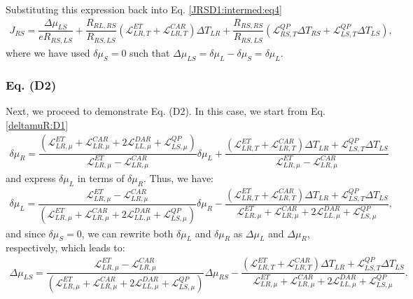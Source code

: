 Substituting this expression back into Eq. \eqref{JRSD1:intermed:eq4}
\begin{align}\label{JRSD1:intermed:eq5}
J_{RS}=
\dfrac{\Delta\mu_{LS}}{eR_{RS,LS}}
+
\dfrac{R_{RL,RS}}{R_{RS,LS}}
(\mathcal{L}_{LR,T}^{ET}+\mathcal{L}_{LR,T}^{CAR})\Delta T_{LR}
+
\dfrac{R_{RS,RS}}{R_{RS,LS}}(\mathcal{L}^{QP}_{RS,T}\Delta T_{RS}+\mathcal{L}^{QP}_{LS,T}\Delta T_{LS}),
\end{align}
where we have used $\delta\mu_{S}=0$ such that $\Delta\mu_{LS}=\delta\mu_{L}-\delta\mu_{S}=\delta\mu_{L}$.

\subsubsection{Eq. (D2)}

Next, we proceed to demonstrate Eq. (D2). In this case, we start from Eq. \eqref{deltamuR:D1}
\begin{multline*}
\delta\mu_{R}=\dfrac{
(\mathcal{L}_{LR,\mu}^{ET}+\mathcal{L}_{LR,\mu}^{CAR}+2\mathcal{L}_{LL,\mu}^{DAR}+\mathcal{L}^{QP}_{LS,\mu})
}{\mathcal{L}_{LR,\mu}^{ET}-\mathcal{L}_{LR,\mu}^{CAR}}\delta\mu_{L}
+
\dfrac{
(\mathcal{L}_{LR,T}^{ET}+\mathcal{L}_{LR,T}^{CAR})\Delta T_{LR}
+
\mathcal{L}^{QP}_{LS,T}\Delta T_{LS}}{\mathcal{L}_{LR,\mu}^{ET}-\mathcal{L}_{LR,\mu}^{CAR}}
\end{multline*}
and express $\delta\mu_{L}$ in terms of $\delta\mu_{R}$. Thus, we have:
\begin{align*}
\delta\mu_{L}=\dfrac{\mathcal{L}_{LR,\mu}^{ET}-\mathcal{L}_{LR,\mu}^{CAR}}{(\mathcal{L}_{LR,\mu}^{ET}+\mathcal{L}_{LR,\mu}^{CAR}+2\mathcal{L}_{LL,\mu}^{DAR}+\mathcal{L}^{QP}_{LS,\mu})}\delta\mu_{R}
-
\dfrac{
(\mathcal{L}_{LR,T}^{ET}+\mathcal{L}_{LR,T}^{CAR})\Delta T_{LR}
+
\mathcal{L}^{QP}_{LS,T}\Delta T_{LS}}{\mathcal{L}_{LR,\mu}^{ET}+\mathcal{L}_{LR,\mu}^{CAR}+2\mathcal{L}_{LL,\mu}^{DAR}+\mathcal{L}^{QP}_{LS,\mu}},
\end{align*}
and since $\delta\mu_{S}=0$, we can rewrite both $\delta\mu_{L}$ and $\delta\mu_{R}$ as $\Delta\mu_{L}$ and $\Delta\mu_{R}$, respectively, which leads to:
\begin{align}\label{DeltamuLSRS}
\Delta\mu_{LS}=\dfrac{\mathcal{L}_{LR,\mu}^{ET}-\mathcal{L}_{LR,\mu}^{CAR}}{(\mathcal{L}_{LR,\mu}^{ET}+\mathcal{L}_{LR,\mu}^{CAR}+2\mathcal{L}_{LL,\mu}^{DAR}+\mathcal{L}^{QP}_{LS,\mu})}\Delta\mu_{RS}
-
\dfrac{
(\mathcal{L}_{LR,T}^{ET}+\mathcal{L}_{LR,T}^{CAR})\Delta T_{LR}
+
\mathcal{L}^{QP}_{LS,T}\Delta T_{LS}}{\mathcal{L}_{LR,\mu}^{ET}+\mathcal{L}_{LR,\mu}^{CAR}+2\mathcal{L}_{LL,\mu}^{DAR}+\mathcal{L}^{QP}_{LS,\mu}}.
\end{align}

